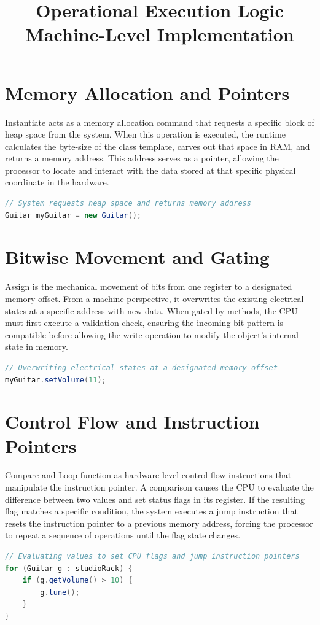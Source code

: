 \documentclass[12pt]{article}
\title{Operational Execution Logic \\ \large Machine-Level Implementation}
\date{}
\begin{document}
\maketitle

\section{Memory Allocation and Pointers}
Instantiate acts as a memory allocation command that requests a specific block of heap space from the system. When this operation is executed, the runtime calculates the byte-size of the class template, carves out that space in RAM, and returns a memory address. This address serves as a pointer, allowing the processor to locate and interact with the data stored at that specific physical coordinate in the hardware.

\begin{lstlisting}[language=Java]
// System requests heap space and returns memory address
Guitar myGuitar = new Guitar(); 
\end{lstlisting}

\section{Bitwise Movement and Gating}
Assign is the mechanical movement of bits from one register to a designated memory offset. From a machine perspective, it overwrites the existing electrical states at a specific address with new data. When gated by methods, the CPU must first execute a validation check, ensuring the incoming bit pattern is compatible before allowing the write operation to modify the object's internal state in memory.

\begin{lstlisting}[language=Java]
// Overwriting electrical states at a designated memory offset
myGuitar.setVolume(11); 
\end{lstlisting}

\section{Control Flow and Instruction Pointers}
Compare and Loop function as hardware-level control flow instructions that manipulate the instruction pointer. A comparison causes the CPU to evaluate the difference between two values and set status flags in its register. If the resulting flag matches a specific condition, the system executes a jump instruction that resets the instruction pointer to a previous memory address, forcing the processor to repeat a sequence of operations until the flag state changes.

\begin{lstlisting}[language=Java]
// Evaluating values to set CPU flags and jump instruction pointers
for (Guitar g : studioRack) {
    if (g.getVolume() > 10) {
        g.tune();
    }
}
\end{lstlisting}
\end{document}
